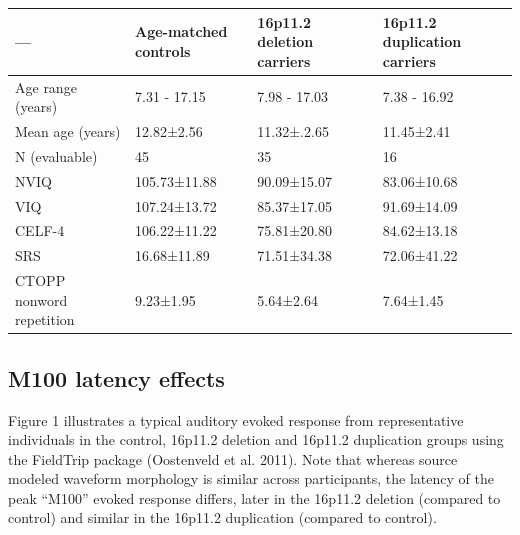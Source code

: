 \documentclass[]{article}
\begin{document}
\begin{longtable}[c]{@{}llll@{}}
\toprule
--- & Age-matched controls & 16p11.2 deletion carriers & 16p11.2
duplication carriers\tabularnewline
\midrule
\endhead
Age range (years) & 7.31 - 17.15 & 7.98 - 17.03 & 7.38 -
16.92\tabularnewline
Mean age (years) & 12.82±2.56 & 11.32±.2.65 & 11.45±2.41\tabularnewline
N (evaluable) & 45 & 35 & 16\tabularnewline
NVIQ & 105.73±11.88 & 90.09±15.07 & 83.06±10.68\tabularnewline
VIQ & 107.24±13.72 & 85.37±17.05 & 91.69±14.09\tabularnewline
CELF-4 & 106.22±11.22 & 75.81±20.80 & 84.62±13.18\tabularnewline
SRS & 16.68±11.89 & 71.51±34.38 & 72.06±41.22\tabularnewline
CTOPP nonword repetition & 9.23±1.95 & 5.64±2.64 &
7.64±1.45\tabularnewline
\bottomrule
\end{longtable}

\subsection{M100 latency effects}\label{m100-latency-effects}

Figure 1 illustrates a typical auditory evoked response from
representative individuals in the control, 16p11.2 deletion and 16p11.2
duplication groups using the FieldTrip package (Oostenveld et al. 2011).
Note that whereas source modeled waveform morphology is similar across
participants, the latency of the peak ``M100'' evoked response differs,
later in the 16p11.2 deletion (compared to control) and similar in the
16p11.2 duplication (compared to control).
\end{document}
